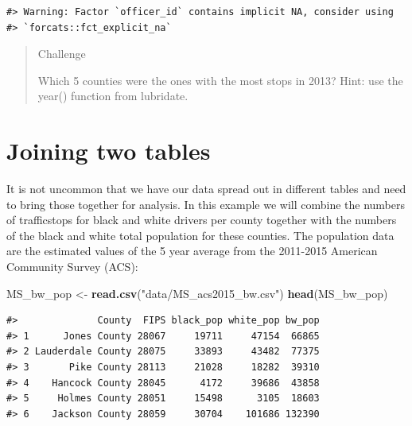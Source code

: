 \documentclass[]{book}
\newenvironment{Shaded}{\begin{snugshade}}{\end{snugshade}}
\newcommand{\CommentTok}[1]{\textcolor[rgb]{0.56,0.35,0.01}{\textit{#1}}}
\newcommand{\KeywordTok}[1]{\textcolor[rgb]{0.13,0.29,0.53}{\textbf{#1}}}
\newcommand{\NormalTok}[1]{#1}
\newcommand{\OperatorTok}[1]{\textcolor[rgb]{0.81,0.36,0.00}{\textbf{#1}}}
\newcommand{\StringTok}[1]{\textcolor[rgb]{0.31,0.60,0.02}{#1}}
\begin{document}
\begin{Shaded}
\end{Shaded}

\begin{verbatim}
#> Warning: Factor `officer_id` contains implicit NA, consider using
#> `forcats::fct_explicit_na`
\end{verbatim}

\begin{quote}
Challenge

Which 5 counties were the ones with the most stops in 2013?
Hint: use the year() function from lubridate.
\end{quote}

\hypertarget{joining-two-tables}{%
\section{Joining two tables}\label{joining-two-tables}}

It is not uncommon that we have our data spread out in different tables and need to bring those together for analysis. In this example we will combine the numbers of trafficstops for black and white drivers per county together with the numbers of the black and white total population for these counties. The population data are the estimated values of the 5 year average from the 2011-2015 American Community Survey (ACS):

\begin{Shaded}
\begin{Highlighting}[]
\NormalTok{MS_bw_pop <-}\StringTok{ }\KeywordTok{read.csv}\NormalTok{(}\StringTok{"data/MS_acs2015_bw.csv"}\NormalTok{)}
\KeywordTok{head}\NormalTok{(MS_bw_pop)}
\end{Highlighting}
\end{Shaded}

\begin{verbatim}
#>              County  FIPS black_pop white_pop bw_pop
#> 1      Jones County 28067     19711     47154  66865
#> 2 Lauderdale County 28075     33893     43482  77375
#> 3       Pike County 28113     21028     18282  39310
#> 4    Hancock County 28045      4172     39686  43858
#> 5     Holmes County 28051     15498      3105  18603
#> 6    Jackson County 28059     30704    101686 132390
\end{verbatim}
\end{document}
